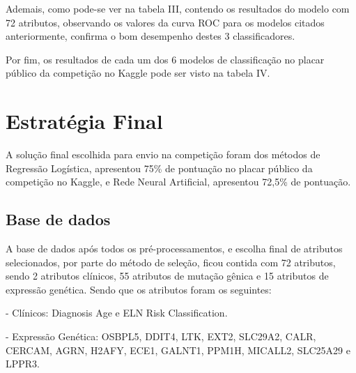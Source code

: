 \documentclass[10pt, conference, compsocconf]{IEEEtran}
\begin{document}
Ademais, como pode-se ver na tabela III, contendo os resultados do modelo com 72 atributos, observando os valores da curva ROC para os modelos citados anteriormente, confirma o bom desempenho destes 3 classificadores.

Por fim, os resultados de cada um dos 6 modelos de classificação no placar público da competição no Kaggle pode ser visto na tabela IV.

\begin{table}[]
\caption{Métricas dos algoritmos para a base com 72 atributos}
\centering
{}
\end{table}

\section{Estratégia Final}
A solução final escolhida para envio na competição foram dos métodos de Regressão Logística, apresentou 75\% de pontuação no placar público da competição no Kaggle, e Rede Neural Artificial, apresentou 72,5\% de pontuação.

\subsection{Base de dados}
A base de dados após todos os pré-processamentos, e escolha final de atributos selecionados, por parte do método de seleção, ficou contida com 72 atributos, sendo 2 atributos clínicos, 55 atributos de mutação gênica e 15 atributos de expressão genética. Sendo que os atributos foram os seguintes:

- Clínicos: Diagnosis Age e ELN Risk Classification.

- Expressão Genética: OSBPL5, DDIT4, LTK, EXT2, SLC29A2, CALR, CERCAM, AGRN, H2AFY, ECE1, GALNT1, PPM1H, MICALL2, SLC25A29 e LPPR3.
\end{document}
